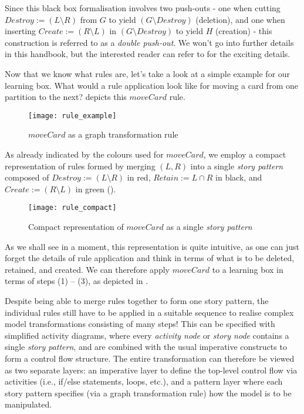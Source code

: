 Since this black box formalisation involves two push-outs - one when cutting $Destroy := (L\setminus R)$ from $G$ to yield $(G\setminus Destroy)$ (deletion),
and one when inserting $Create := (R\setminus L)$ in $(G\setminus Destroy)$ to yield $H$ (creation) - this construction is referred to as a \emph{double
push-out}. We won't go into further details in this handbook, but the interested reader can refer to \cite{EEPT06} for the exciting details.

Now that we know what rules are, let's take a look at a simple example for our learning box. What would a rule application look like for moving a card from
one partition to the next?  depicts this $moveCard$ rule.
  
\begin{figure}[htp]
\begin{center}
  \texttt{[image: rule\_example]}
  \caption[]{$moveCard$ as a graph transformation rule}	
  \label{fig:rule_example}
\end{center}
\end{figure}


As already indicated by the colours used for $moveCard$, we employ a compact representation of rules formed by merging $(L,R)$ into a single \emph{story
pattern} composed of  $Destroy := (L\setminus R)$ in red, $Retain :=  L\cap R$ in black, and $Create := (R\setminus L)$ in green
().

\begin{figure}[htp]
\begin{center}
  \texttt{[image: rule\_compact]}
  \caption[]{Compact representation of $moveCard$ as a single \emph{story pattern}}
  \label{fig:rule_compact}
\end{center}
\end{figure}

As we shall see in a moment, this  representation is quite intuitive, as one can just forget the details of rule application and think in terms of what is to be
deleted, retained, and created. We can therefore apply $moveCard$ to a learning box in terms of steps (1) -- (3), as depicted in .

Despite being able to merge rules together to form one story pattern, the individual rules still have to be applied in a suitable sequence to realise complex
model transformations consisting of many steps! This can be specified with simplified activity diagrams, where every \emph{activity node}
or \emph{story node} contains a single \emph{story pattern}, and are combined with the usual imperative constructs to form a control flow structure. The entire
transformation can therefore be viewed as two separate layers: an imperative layer to define the top-level control flow via activities (i.e., if/else
statements, loops, etc.), and a pattern layer where each story pattern specifies (via a graph transformation rule) how the model is to be manipulated.

